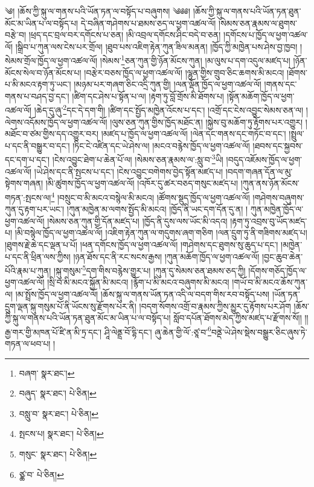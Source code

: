 \setcounter{footnote}{0} 
༄། །ཆོས་ཀྱི་སྐུ་ལ་གནས་པའི་ཡོན་ཏན་ལ་བསྟོད་པ་བཞུགས། ༄༅༅། །ཆོས་ཀྱི་སྐུ་ལ་གནས་པའི་ཡོན་ཏན་ཐུན་མོང་མ་ཡིན་པ་ལ་བསྟོད་པ། དེ་བཞིན་གཤེགས་པ་ཐམས་ཅད་ལ་ཕྱག་འཚལ་ལོ། །སེམས་ཅན་རྣམས་ལ་ཐུགས་བརྩེ་བ། །ཕྲད་དང་བྲལ་བར་དགོངས་པ་ཅན། །མི་འབྲལ་དགོངས་ཤིང་བདེ་བ་ཅན། །དགོངས་པ་ཁྱོད་ལ་ཕྱག་འཚལ་ལོ། །སྒྲིབ་པ་ཀུན་ལས་ངེས་པར་གྲོལ། །ཐུབ་པས་འཇིག་རྟེན་ཀུན་ཟིལ་མནན། །ཁྱོད་ཀྱི་མཁྱེན་པས་ཤེས་བྱ་ཁྱབ། །སེམས་གྲོལ་ཁྱོད་ལ་ཕྱག་འཚལ་ལོ། །སེམས་\footnote{བཞག་  སྣར་ཐང་། }ཅན་ཀུན་གྱི་ཉོན་མོངས་ཀུན། །མ་ལུས་པ་དག་འདུལ་མཛད་པ། །ཉོན་མོངས་སེལ་བ་ཉོན་མོངས་པ། །བརྩེར་བཅས་ཁྱོད་ལ་ཕྱག་འཚལ་ལོ། །ལྷུན་གྱིས་གྲུབ་ཅིང་ཆགས་མི་མངའ། །ཐོགས་པ་མི་མངའ་རྟག་ཏུ་ཡང་། །མཉམ་པར་གཞག་ཅིང་འདྲི་ཀུན་གྱི། །ལན་ལྡོན་ཁྱོད་ལ་ཕྱག་འཚལ་ལོ། །གནས་དང་གནས་པ་བཤད་བྱ་དང་། །ཚིག་དང་ཤེས་པ་སྟོན་པ་ལ། །རྟག་ཏུ་བློ་གྲོས་མི་ཐོགས་པ། །སྟོན་མཆོག་ཁྱོད་ལ་ཕྱག་འཚལ་ལོ། །ཆེད་དུ་ཞུ་\footnote{བཞུད་  སྣར་ཐང་།  པེ་ཅིན། }དང་དེ་དག་གི། །ཚིག་དང་སྤྱོད་མཁྱེན་འོངས་པ་དང་། །འགྲོ་དང་ངེས་འབྱུང་སེམས་ཅན་ལ། །ལེགས་འདོམས་ཁྱོད་ལ་ཕྱག་འཚལ་ལོ། །ལུས་ཅན་ཀུན་གྱིས་ཁྱོད་མཐོང་ན། །སྐྱེས་བུ་མཆོག་ཏུ་རྟོགས་པར་འགྱུར། །མཐོང་བ་ཙམ་གྱིས་དད་འགྱུར་བར། །མཛད་པ་ཁྱོད་ལ་ཕྱག་འཚལ་ལོ། །ལེན་དང་གནས་དང་གཏོང་བ་དང་། །སྤྲུལ་པ་དང་ནི་བསྒྱུར་བ་དང་། །ཏིང་ངེ་འཛིན་དང་ཡེ་ཤེས་ལ། །མངའ་བརྙེས་ཁྱོད་ལ་ཕྱག་འཚལ་ལོ། །ཐབས་དང་སྐྱབས་དང་དག་པ་དང་། །ངེས་འབྱུང་ཐེག་པ་ཆེན་པོ་ལ། །སེམས་ཅན་རྣམས་ལ་:སླུ་བ་\footnote{བསླུ་བ་  སྣར་ཐང་།  པེ་ཅིན། }ཡི། །བདུད་འཇོམས་ཁྱོད་ལ་ཕྱག་འཚལ་ལོ། །ཡེ་ཤེས་དང་ནི་སྤངས་པ་དང་། །ངེས་འབྱུང་བགེགས་བྱེད་སྟོན་མཛད་པ། །བདག་གཞན་དོན་ལ་མུ་སྟེགས་གཞན། །མི་ཚུགས་ཁྱོད་ལ་ཕྱག་འཚལ་ལོ། །འཁོར་དུ་ཚར་བཅད་གསུང་མཛད་པ། །ཀུན་ནས་ཉོན་མོངས་གཏན་:སྤངས་ལ།\footnote{སྤངས་པ།  སྣར་ཐང་།  པེ་ཅིན། } །བསྲུང་བ་མི་མངའ་བསྙེལ་མི་མངའ། །ཚོགས་སྡུད་ཁྱོད་ལ་ཕྱག་འཚལ་ལོ། །གཤེགས་བཞུགས་ཀུན་དུ་རྟག་པར་ཡང་། །ཀུན་མཁྱེན་མ་ལགས་སྤྱོད་མི་མངའ། །ཁྱོད་ནི་ཡང་དག་དོན་དུ་ན། །
ཀུན་མཁྱེན་ཁྱོད་ལ་ཕྱག་འཚལ་ལོ། །སེམས་ཅན་ཀུན་གྱི་དོན་མཛད་པ། །ཁྱོད་ནི་དུས་ལས་ཡོང་མི་འདའ། །རྟག་ཏུ་འབྲས་བུ་ཡོད་མཛད་པ། །མི་བསྙེལ་ཁྱོད་ལ་ཕྱག་འཚལ་ལོ། །འཇིག་རྟེན་ཀུན་ལ་གདུགས་ཞག་གཅིག །ལན་དྲུག་ཏུ་ནི་གཟིགས་མཛད་པ། །ཐུགས་རྗེ་ཆེ་དང་ལྡན་པ་པོ། །ཕན་དགོངས་ཁྱོད་ལ་ཕྱག་འཚལ་ལོ། །གཤེགས་དང་ཐུགས་སུ་ཆུད་པ་དང་། །མཁྱེན་པ་དང་ནི་ཕྲིན་ལས་ཀྱིས། །ཉན་ཐོས་དང་ནི་རང་སངས་རྒྱས། །ཀུན་མཆོག་ཁྱོད་ལ་ཕྱག་འཚལ་ལོ། །བྱང་ཆུབ་ཆེན་པོའི་རྣམ་པ་ཀུན། །སྐུ་གསུམ་\footnote{གསུང་  སྣར་ཐང་།  པེ་ཅིན། }དག་གིས་བརྙེས་གྱུར་པ། །ཀུན་དུ་སེམས་ཅན་ཐམས་ཅད་ཀྱི། །དོགས་གཅོད་ཁྱོད་ལ་ཕྱག་འཚལ་ལོ། །སྲི་བ་མི་མངའ་སྐྱོན་མི་མངའ། །རྙོག་པ་མི་མངའ་བཞུགས་མི་མངའ། །གཡོ་བ་མི་མངའ་ཆོས་ཀུན་ལ། །མ་སྤྲོས་ཁྱོད་ལ་ཕྱག་འཚལ་ལོ། །ཆོས་སྐུ་ལ་གནས་ཡོན་ཏན་འདི་ལ་བདག་གིས་རབ་བསྟོད་པས། །ཡོན་ཏན་དྲུག་ལྡན་སྐུ་གསུམ་པོ་ནི་ཡོངས་སུ་རྫོགས་པར་ནི། །བདག་སོགས་འགྲོ་བ་རྣམས་ཀྱིས་མྱུར་དུ་རྟོགས་པར་ཤོག །ཆོས་ཀྱི་སྐུ་ལ་གནས་པའི་ཡོན་ཏན་ཐུན་མོང་མ་ཡིན་པ་ལ་བསྟོད་པ། སློབ་དཔོན་ཐོགས་མེད་ཀྱིས་མཛད་པ་རྫོགས་སོ།། །།རྒྱ་གར་གྱི་མཁན་པོ་ཛི་ན་མི་ཏྲ་དང་། ཤཱི་ལེནྡྲ་བོ་དྷི་དང་། ཞུ་ཆེན་གྱི་ལོ་:ཙཱ་བ་\footnote{ཙྪ་བ་  པེ་ཅིན། }བནྡེ་ཡེ་ཤེས་སྡེས་བསྒྱུར་ཅིང་ཞུས་ཏེ་གཏན་ལ་ཕབ་པ། ། 